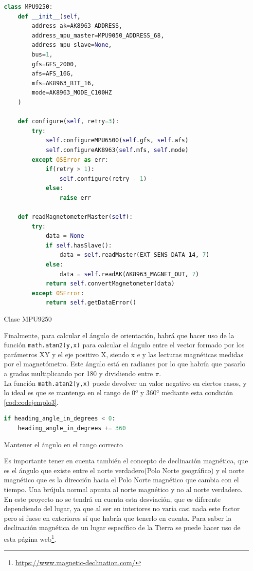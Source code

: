 \begin{code}[H]
\begin{lstlisting}[language=Python]
class MPU9250:
    def __init__(self, 
        address_ak=AK8963_ADDRESS, 
        address_mpu_master=MPU9050_ADDRESS_68, 
        address_mpu_slave=None, 
        bus=1, 
        gfs=GFS_2000, 
        afs=AFS_16G, 
        mfs=AK8963_BIT_16, 
        mode=AK8963_MODE_C100HZ
    )
       
    def configure(self, retry=3):
        try:
            self.configureMPU6500(self.gfs, self.afs)
            self.configureAK8963(self.mfs, self.mode)
        except OSError as err:
            if(retry > 1):
                self.configure(retry - 1)
            else:
                raise err
     
    def readMagnetometerMaster(self):
        try:
            data = None
            if self.hasSlave():
                data = self.readMaster(EXT_SENS_DATA_14, 7)          
            else:   
                data = self.readAK(AK8963_MAGNET_OUT, 7)
            return self.convertMagnetometer(data)
        except OSError:
            return self.getDataError()           
\end{lstlisting}
\caption[Clase MPU9250]{Clase MPU9250}
\label{cod:codejemplo}
\end{code}


Finalmente, para calcular el ángulo de orientación, habrá que hacer uso de la función \verb|math.atan2(y,x)| para calcular el ángulo entre el vector formado por los parámetros XY y el eje positivo X, siendo x e y las lecturas magnéticas medidas por el magnetómetro. Este ángulo está en radianes por lo que habría que pasarlo a grados multiplicando por 180 y dividiendo entre \(\pi\).\\

La función \verb|math.atan2(y,x)| puede devolver un valor negativo en ciertos casos, y lo ideal es que se mantenga en el rango de 0º y 360º mediante esta condición \ref{cod:codejemplo3}.


\begin{code}[H]
\begin{lstlisting}[language=Python]
if heading_angle_in_degrees < 0:
    heading_angle_in_degrees += 360
\end{lstlisting}
\caption[Mantener el ángulo en el rango correcto]{Mantener el ángulo en el rango correcto}
\label{cod:codejemplo3}
\end{code}


Es importante tener en cuenta también el concepto de declinación magnética, que es el ángulo que existe entre el norte verdadero(Polo Norte geográfico) y el norte magnético que es la dirección hacia el Polo Norte magnético que cambia con el tiempo. Una brújula normal apunta al norte magnético y no al norte verdadero. En este proyecto no se tendrá en cuenta esta desviación, que es diferente dependiendo del lugar, ya que al ser en interiores no varía casi nada este factor pero si fuese en exteriores sí que habría que tenerlo en cuenta. Para saber la declinación magnética de un lugar específico de la Tierra se puede hacer uso de esta página web\footnote{\url{https://www.magnetic-declination.com/}}.\\


